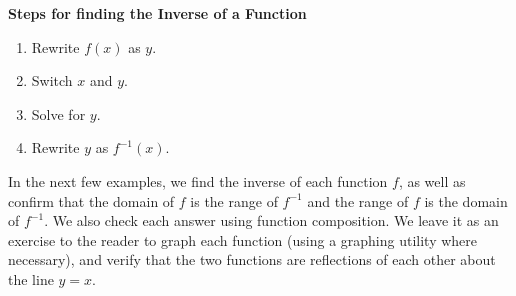 \documentclass[11pt]{book}
\theoremstyle{definition}  %
\newcommand{\bbm}{\begin{boxedminipage}{4.80in}} %
\newcommand{\ebm}{\end{boxedminipage}}
\begin{document}
\smallskip

\colorbox{ResultColor}{\bbm

 \label{inverseprocedure}

\centerline{\textbf{Steps for finding the Inverse of a Function}} 

\begin{enumerate}

\item  Rewrite $f(x)$ as $y$.

\item  Switch $x$ and $y$.

\item  Solve for $y$.

\item  Rewrite $y$ as $f^{-1}(x)$.

\end{enumerate}

\ebm}

\smallskip 

In the next few examples, we find the inverse of each function $f$, as well as confirm that the domain of $f$ is the range of $f^{-1}$ and the range of $f$ is the domain of $f^{-1}$.  We also check each answer using function composition.  We leave it as an exercise to the reader to graph each function (using a graphing utility where necessary), and verify that the two functions are reflections of each other about the line $y=x$.
\end{document}
